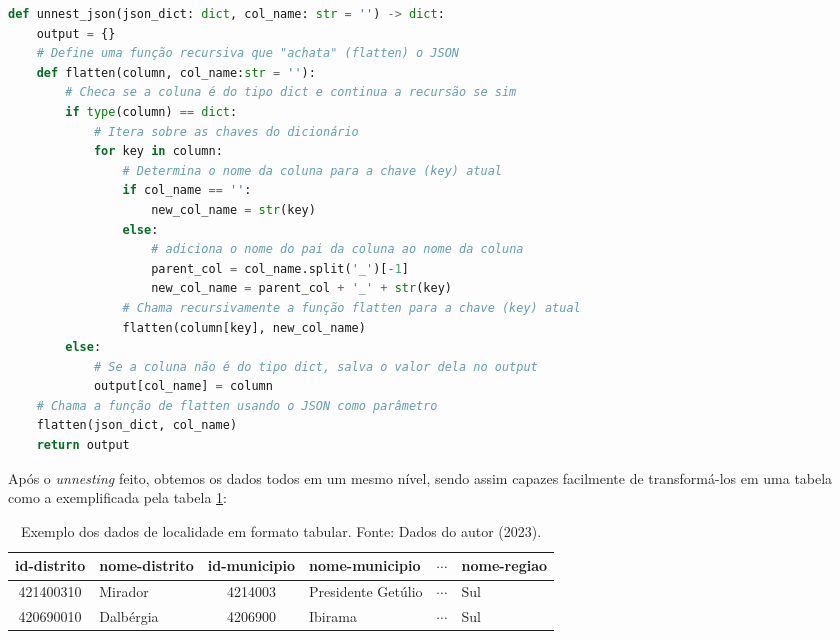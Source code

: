 \begin{lstlisting}[float = h, label={lst:unnesting},language=Python, caption=Algoritmo de \textit{unnesting} em \textit{python}.]
def unnest_json(json_dict: dict, col_name: str = '') -> dict:
    output = {}
    # Define uma função recursiva que "achata" (flatten) o JSON
    def flatten(column, col_name:str = ''):
        # Checa se a coluna é do tipo dict e continua a recursão se sim
        if type(column) == dict:
            # Itera sobre as chaves do dicionário
            for key in column:
                # Determina o nome da coluna para a chave (key) atual
                if col_name == '':
                    new_col_name = str(key)
                else:
                    # adiciona o nome do pai da coluna ao nome da coluna
                    parent_col = col_name.split('_')[-1]
                    new_col_name = parent_col + '_' + str(key)
                # Chama recursivamente a função flatten para a chave (key) atual
                flatten(column[key], new_col_name)
        else:
            # Se a coluna não é do tipo dict, salva o valor dela no output
            output[col_name] = column
    # Chama a função de flatten usando o JSON como parâmetro
    flatten(json_dict, col_name)
    return output
\end{lstlisting}

    Após o \textit{unnesting} feito, obtemos os dados todos em um mesmo nível, sendo assim capazes facilmente de transformá-los em uma tabela como a exemplificada pela tabela \ref{tab:exemplo-api-localidades}:

\begin{center}
    \begin{table}[h]
        \begin{tabular}{c l c l c l}
            \hline
                id-distrito & nome-distrito & id-municipio & nome-municipio & $\dotsi$ & nome-regiao\\
            \hline
                421400310 & Mirador & 4214003 & Presidente Getúlio & $\dotsi$ & Sul\\
                420690010 & Dalbérgia & 4206900 & Ibirama & $\dotsi$ & Sul\\     
            \hline
        \end{tabular}
        \caption{Exemplo dos dados de localidade em formato tabular. Fonte: Dados do autor (2023).}
        \label{tab:exemplo-api-localidades}
    \end{table}
\end{center}

